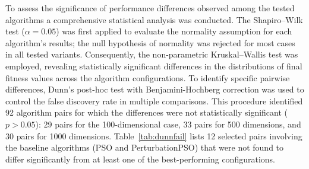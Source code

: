 {To assess the significance of performance differences observed among the tested algorithms a comprehensive statistical analysis was conducted. The Shapiro–Wilk test ($\alpha = 0.05$) was first applied to evaluate the normality assumption for each algorithm's results; the null hypothesis of normality was rejected for most cases in all tested variants. Consequently, the non-parametric Kruskal–Wallis test was employed, revealing statistically significant differences in the distributions of final fitness values across the algorithm configurations. To identify specific pairwise differences, Dunn’s post-hoc test with Benjamini-Hochberg correction \citep{haynes2013benjaminihochberg} was used to control the false discovery rate in multiple comparisons. This procedure identified 92 algorithm pairs for which the differences were not statistically significant ($p > 0.05$): 29 pairs for the 100-dimensional case, 33 pairs for 500 dimensions, and 30 pairs for 1000 dimensions.
%
Table~\ref{tab:dunnfail} lists 12 selected pairs involving the baseline algorithms (PSO and PerturbationPSO) that were not found to differ significantly from at least one of the best-performing configurations.


}
